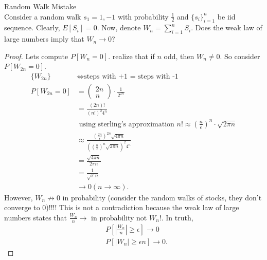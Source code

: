 \documentclass[a4paper]{article}
\begin{document}
  \begin{note}{Random Walk Mistake}\\
    Consider a random walk $s_1 = 1, -1$ with probability  $\frac{1}{2}$ and $\{s_i\}_{i=1}^{n} $ be iid sequence. Clearly, $E[S_i] = 0$. Now, denote  $W_n = \sum_{i=1}^{n} S_i$. Does the weak law of large numbers imply that $W_n \to 0$?

    \begin{proof}
      Lets compute $P[W_n = 0]$. realize that if $n$ odd, then  $W_n \neq 0$. So consider  $P[W_{2n} = 0]$.
       \begin{align*}
         \{W_{2n}\} &\iff \text{steps with +1 = steps with -1} \\
          P[W_{2n} = 0] &= \begin{pmatrix} 2n \\ n \end{pmatrix} \cdot \frac{1}{2^{2n}} \\
                        &= \frac{(2n)!}{(n!)^{2} 4^{n}} \\
                        &\text{ using sterling's approximation $n! \approx \left( \frac{n}{\epsilon} \right)^{n} \cdot \sqrt{2\pi n}  $} \\
                        &\approx \frac{\left( \frac{2n}{\epsilon} \right)^{2n} \sqrt{4 \pi n}  }{\left( (\frac{n}{\epsilon})^{n} \sqrt{2 \pi n}  \right)^{2} 4^{n} } \\
                        &= \frac{\sqrt{4 \pi n} }{2 \pi n} \\
                        &= \frac{1}{\sqrt{\pi} n  } \\
                        &\to 0 (n \to \infty)
       .\end{align*}
       However, $W_n \not\to 0$ in probability (consider the random walks of stocks, they don't converge to 0)!!!! This is not a contradiction because the weak law of large numbers states that $\frac{W_n}{n} \to$ in probability not $W_n$!. In truth,
       \begin{align*}
         & P[|\frac{W_n}{n}| \geq \epsilon] \to 0 \\
         & P[|W_n| \geq \epsilon n] \to 0  
       .\end{align*}
    \end{proof}
\end{note}
\end{document}
